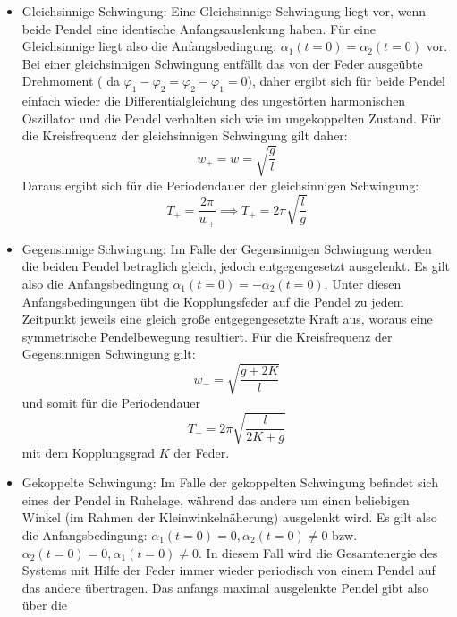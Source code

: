 \begin{itemize}
\item Gleichsinnige Schwingung: \newline
Eine Gleichsinnige Schwingung liegt vor, wenn beide Pendel eine identische Anfangsauslenkung haben. 
Für eine Gleichsinnige liegt also die Anfangsbedingung: $\alpha_1(t=0)=\alpha_2(t=0)$ vor. Bei einer 
gleichsinnigen Schwingung entfällt das von der Feder ausgeübte Drehmoment 
( da $\varphi_1-\varphi_2=\varphi_2-\varphi_1=0$), daher ergibt sich für beide Pendel einfach wieder die 
Differentialgleichung des ungestörten harmonischen Oszillator und die Pendel verhalten sich wie im 
ungekoppelten Zustand. Für die Kreisfrequenz der gleichsinnigen Schwingung gilt daher:
\begin{equation}
w_+=w=\sqrt{\frac{g}{l}}
\end{equation}
Daraus ergibt sich für die Periodendauer der gleichsinnigen Schwingung:
\begin{equation}
T_+=\frac{2\pi}{w_+} \implies T_+=2\pi\sqrt{\frac{l}{g}}
\end{equation}
\item Gegensinnige Schwingung: \newline
Im Falle der Gegensinnigen Schwingung werden die beiden Pendel betraglich gleich, jedoch entgegengesetzt ausgelenkt. Es gilt also die Anfangsbedingung $\alpha_1(t=0)=-\alpha_2(t=0)$. Unter diesen Anfangsbedingungen übt die Kopplungsfeder auf die Pendel zu jedem Zeitpunkt jeweils eine gleich große entgegengesetzte Kraft aus, woraus eine symmetrische Pendelbewegung resultiert. Für die Kreisfrequenz der Gegensinnigen Schwingung gilt:
\begin{equation}
w_-=\sqrt{\frac{g+2K}{l}}
\end{equation}
und somit für die Periodendauer
\begin{equation}
T_-=2\pi\sqrt{\frac{l}{2K+g}}
\end{equation}
mit dem Kopplungsgrad $K$ der Feder.
\item Gekoppelte Schwingung: \newline
Im Falle der gekoppelten Schwingung befindet sich eines der Pendel in Ruhelage, während das andere um 
einen beliebigen Winkel (im Rahmen der Kleinwinkelnäherung) ausgelenkt wird. Es gilt also die 
Anfangsbedingung: $\alpha_1(t=0)=0,\alpha_2(t=0)\neq0$ bzw. $\alpha_2(t=0)=0,\alpha_1(t=0)\neq0$. 
In diesem Fall wird die Gesamtenergie des Systems mit Hilfe der Feder immer wieder periodisch von 
einem Pendel auf das andere übertragen. Das anfangs maximal ausgelenkte Pendel gibt also über die 

\end{itemize}
